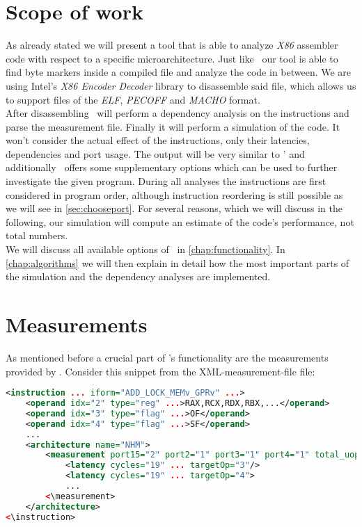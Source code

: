  
\section{Scope of work}

As already stated we will present a tool that is able to analyze \emph{X86} assembler code with respect to a specific microarchitecture. Just like \iaca\ our tool is able to find byte markers inside a compiled file and analyze the code in between.  We are using Intel's \emph{X86 Encoder Decoder} library \cite{xed} to disassemble said file, which allows us to support files of the \emph{ELF}, \emph{PECOFF} and \emph{MACHO} format.\\

After disassembling \suaca\ will perform a dependency analysis on the instructions and parse the measurement file. Finally it will perform a simulation of the code. It won't consider the actual effect of the instructions, only their latencies, dependencies and port usage. The output will be very similar to \iaca' and additionally \suaca\ offers some supplementary options which can be used to further investigate the given program. During all analyses the instructions are first considered in program order, although instruction reordering is still possible as we will see in \autoref{sec:chooseport}. For several reasons, which we will discuss in the following, our simulation will compute an estimate of the code's performance, not total numbers.\\
We will discuss all available options of \suaca\ in \autoref{chap:functionality}. In \autoref{chap:algorithms} we will then explain in detail how the most important parts of the simulation and the dependency analyses are implemented.



\section{Measurements}
\label{sec:measurements}

As mentioned before a crucial part of \suaca's functionality are the measurements provided by \cite{Andreas}. Consider this snippet from the XML-measurement-file file:

\begin{lstlisting}[language=XML, basicstyle=\ttfamily\scriptsize, breaklines=false]
<instruction ... iform="ADD_LOCK_MEMv_GPRv" ...>
    <operand idx="2" type="reg" ...>RAX,RCX,RDX,RBX,...</operand>
    <operand idx="3" type="flag" ...>OF</operand>
    <operand idx="4" type="flag" ...>SF</operand>
    ...
    <architecture name="NHM">
        <measurement port15="2" port2="1" port3="1" port4="1" total_uops="5">
            <latency cycles="19" ... targetOp="3"/>
            <latency cycles="19" ... targetOp="4">
            ...
        <\measurement>
    </architecture>
<\instruction>
\end{lstlisting}

